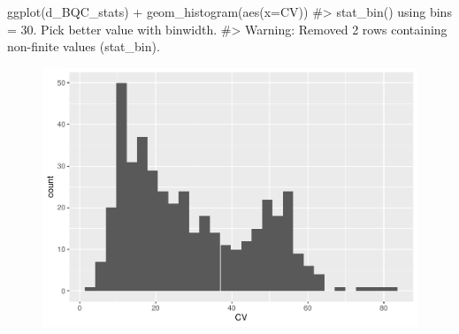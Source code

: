\documentclass[
  letterpaper,
  DIV=11,
  numbers=noendperiod]{scrreprt}
\newenvironment{Shaded}{\begin{snugshade}}{\end{snugshade}}
\newcommand{\AttributeTok}[1]{\textcolor[rgb]{0.40,0.45,0.13}{#1}}
\newcommand{\CommentTok}[1]{\textcolor[rgb]{0.37,0.37,0.37}{#1}}
\newcommand{\FunctionTok}[1]{\textcolor[rgb]{0.28,0.35,0.67}{#1}}
\newcommand{\NormalTok}[1]{\textcolor[rgb]{0.00,0.23,0.31}{#1}}
\newcommand{\SpecialCharTok}[1]{\textcolor[rgb]{0.37,0.37,0.37}{#1}}
\begin{document}
\begin{Shaded}
\begin{Highlighting}[]

\FunctionTok{ggplot}\NormalTok{(d\_BQC\_stats) }\SpecialCharTok{+}
  \FunctionTok{geom\_histogram}\NormalTok{(}\FunctionTok{aes}\NormalTok{(}\AttributeTok{x=}\NormalTok{CV))}
\CommentTok{\#\textgreater{} \textasciigrave{}stat\_bin()\textasciigrave{} using \textasciigrave{}bins = 30\textasciigrave{}. Pick better value with \textasciigrave{}binwidth\textasciigrave{}.}
\CommentTok{\#\textgreater{} Warning: Removed 2 rows containing non{-}finite values (stat\_bin).}
\end{Highlighting}
\end{Shaded}

\begin{figure}[H]

{\centering \includegraphics{./datawrangling_files/figure-pdf/calulcate-column-stats-3.pdf}

}

\end{figure}
\end{document}
